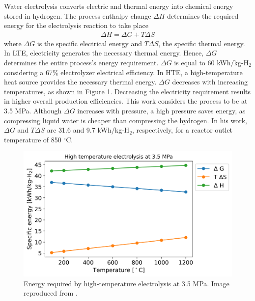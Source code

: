 \documentclass{anstrans}
\begin{document}
Water electrolysis converts electric and thermal energy into chemical energy stored in hydrogen.
The process enthalpy change $\Delta H$ determines the required energy for the electrolysis reaction to take place
\begin{align}
  \Delta H = \Delta G + T \Delta S
\end{align}
where $\Delta G$ is the specific electrical energy and $T \Delta S$, the specific thermal energy.
In LTE, electricity generates the necessary thermal energy.
Hence, $\Delta G$ determines the entire process’s energy requirement.
$\Delta G$ is equal to 60 kWh/kg-H$_2$ considering a 67\% electrolyzer electrical efficiency.
In HTE, a high-temperature heat source provides the necessary thermal energy.
$\Delta G$ decreases with increasing temperatures, as shown in Figure \ref{fig:hte-energy}.
Decreasing the electricity requirement results in higher overall production efficiencies.
This work considers the process to be at 3.5 MPa.
Although $\Delta G$ increases with pressure, a high pressure saves energy, as compressing liquid water is cheaper than compressing the hydrogen.
In his work, $\Delta G$ and $T \Delta S$ are 31.6 and 9.7 kWh/kg-H$_2$, respectively, for a reactor outlet temperature of 850 $^\circ$C.

\begin{figure}[htbp!] %
    \centering
    \includegraphics[width=0.90\linewidth]{figures/hte-energy-P}
    \hfill
    \caption{Energy required by high-temperature electrolysis at 3.5 MPa. Image reproduced from \cite{fairhurst-agosta_multi-physics_2020}.}
    \label{fig:hte-energy}
\end{figure}
\end{document}
